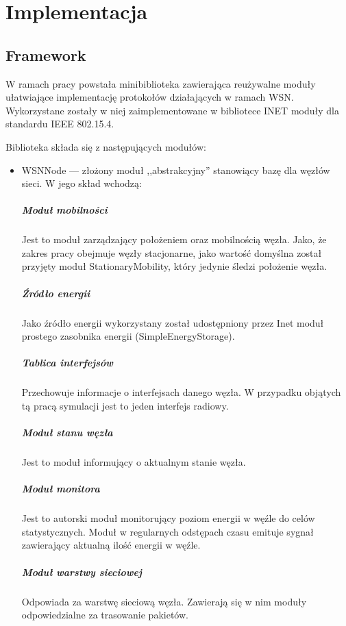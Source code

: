 \chapter{Implementacja}
\section{Framework}
W ramach pracy powstała minibiblioteka zawierająca reużywalne moduły ułatwiające implementację protokołów działających w ramach WSN. Wykorzystane zostały w niej zaimplementowane w bibliotece INET moduły dla standardu IEEE 802.15.4.

Biblioteka składa się z następujących modułów:
\begin{itemize}
	\item WSNNode --- złożony moduł ,,abstrakcyjny'' stanowiący bazę dla węzłów sieci. W jego skład wchodzą:
\paragraph{Moduł mobilności} Jest to moduł zarządzający położeniem oraz mobilnością węzła. Jako, że zakres pracy obejmuje węzły stacjonarne, jako wartość domyślna został przyjęty moduł StationaryMobility, który jedynie śledzi położenie węzła.
\paragraph{Źródło energii} Jako źródło energii wykorzystany został udostępniony przez Inet moduł prostego zasobnika energii (SimpleEnergyStorage).
\paragraph{Tablica interfejsów} Przechowuje informacje o interfejsach danego węzła. W przypadku objątych tą pracą symulacji jest to jeden interfejs radiowy.
\paragraph{Moduł stanu węzła} Jest to moduł informujący o aktualnym stanie węzła.
\paragraph{Moduł monitora} Jest to autorski moduł monitorujący poziom energii w węźle do celów statystycznych. Moduł w regularnych odstępach czasu emituje sygnał zawierający aktualną ilość energii w węźle.
\paragraph{Moduł warstwy sieciowej} Odpowiada za warstwę sieciową węzła. Zawierają się w nim moduły odpowiedzialne za trasowanie pakietów.

\end{itemize}
